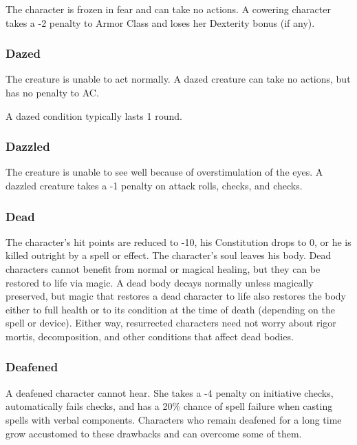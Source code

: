 The character is frozen in fear and can take no actions. A cowering 
character takes a -2 penalty to Armor Class and loses her Dexterity bonus (if any).

\subsubsection{Dazed}

The creature is unable to act normally. A dazed creature can take 
no actions, but has no penalty to AC.

A dazed condition typically lasts 1 round.

\subsubsection{Dazzled}

The creature is unable to see well because of overstimulation 
of the eyes. A dazzled creature takes a -1 penalty on attack rolls,  checks, 
and  checks.

\subsubsection{Dead}

The character's hit points are reduced to -10, his Constitution 
drops to 0, or he is killed outright by a spell or effect. The character's soul 
leaves his body. Dead characters cannot benefit from normal or magical healing, 
but they can be restored to life via magic. A dead body decays normally unless 
magically preserved, but magic that restores a dead character to life also restores 
the body either to full health or to its condition at the time of death (depending 
on the spell or device). Either way, resurrected characters need not worry about 
rigor mortis, decomposition, and other conditions that affect dead bodies.

\subsubsection{Deafened}

A deafened character cannot hear. She takes a -4 penalty on 
initiative checks, automatically fails  checks, and has a 20\% chance of 
spell failure when casting spells with verbal components. Characters who remain 
deafened for a long time grow accustomed to these drawbacks and can overcome some 
of them.

